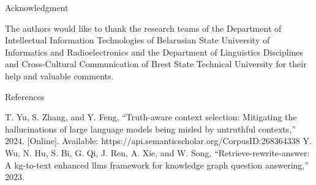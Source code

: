 \documentclass[a4paper]{article}
\begin{document}
\begin{multicols}{2}
\centerline{Acknowledgment}

The authors would like to thank the research teams of
the Department of Intellectual Information Technologies
of Belarusian State University of Informatics and Radioelectronics and the Department of Linguistics Disciplines
and Cross-Cultural Communication of Brest State Technical University for their help and valuable comments.\par
\vspace{3mm}
\centerline{References}

\setcounter{page}{93}%

\cite{1} T. Yu, S. Zhang, and Y. Feng, “Truth-aware context selection:
Mitigating the hallucinations of large language models being
misled by untruthful contexts,” 2024. [Online]. Available:
https://api.semanticscholar.org/CorpusID:268364338
\cite{2} Y. Wu, N. Hu, S. Bi, G. Qi, J. Ren, A. Xie, and W. Song,
“Retrieve-rewrite-answer: A kg-to-text enhanced llms framework
for knowledge graph question answering,” 2023.

\end{multicols}
\end{document}
